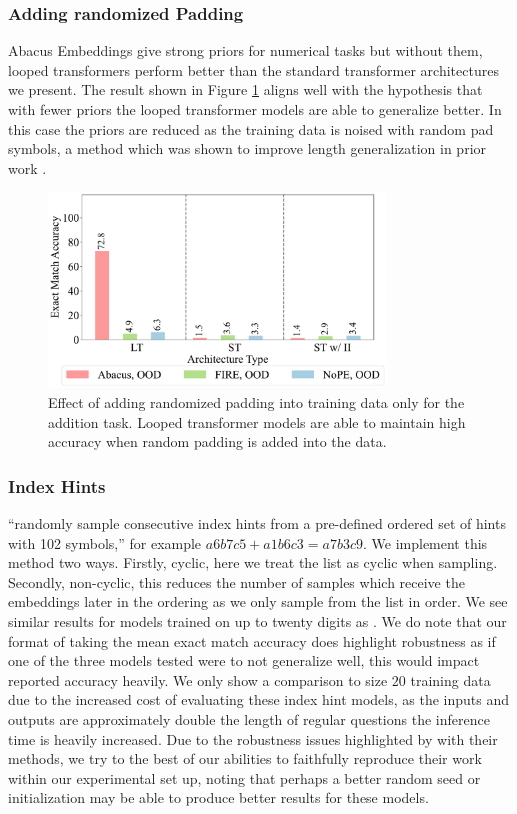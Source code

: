 \documentclass{article}
\begin{document}
\subsubsection{Adding randomized Padding}
Abacus Embeddings give strong priors for numerical tasks but without them, looped transformers perform better than the standard transformer architectures we present.
The result shown in Figure \ref{fig:app_adding_pad} aligns well with the hypothesis that with fewer priors the looped transformer models are able to generalize better.
In this case the priors are reduced as the training data is noised with random pad symbols, a method which was shown to improve length generalization in prior work \citep{shen2023positional}.

\begin{figure}[ht!]
    \centering
    \includegraphics[width=0.8\textwidth]{Figures/plot_eleven_2_bars.pdf}
    \caption{
    Effect of adding randomized padding into training data only for the addition task.
    Looped transformer models are able to maintain high accuracy when random padding is added into the data.
    }
    \label{fig:app_adding_pad}
\end{figure}

\subsubsection{Index Hints}
\citet{zhou2023algorithms} ``randomly sample consecutive index hints from a pre-defined ordered set of hints with 102 symbols,'' for example \(a6b7c5+a1b6c3=a7b3c9\).
We implement this method two ways.
Firstly, cyclic, here we treat the list as cyclic when sampling.
Secondly, non-cyclic, this reduces the number of samples which receive the embeddings later in the ordering as we only sample from the list in order.
We see similar results for models trained on up to twenty digits as \citet{zhou2023algorithms}.
We do note that our format of taking the mean exact match accuracy does highlight robustness as if one of the three models tested were to not generalize well, this would impact reported accuracy heavily.
We only show a comparison to size \(20\) training data due to the increased cost of evaluating these index hint models, as the inputs and outputs are approximately double the length of regular questions the inference time is heavily increased.
Due to the robustness issues highlighted by \citet{zhou2024transformers} with their methods, we try to the best of our abilities to faithfully reproduce their work within our experimental set up, noting that perhaps a better random seed or initialization may be able to produce better results for these models.
\end{document}
